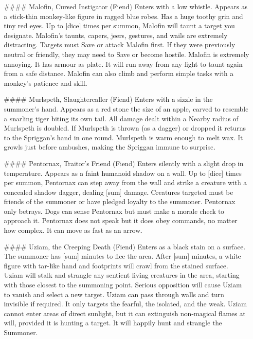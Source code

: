 ####  Malofin, Cursed Instigator (Fiend)
Enters with a low whistle. Appears as a stick-thin monkey-like figure in ragged blue robes. Has a huge toothy grin and tiny red eyes. Up to [dice] times per summon, Malofin will taunt a target you designate. Malofin's taunts, capers, jeers, gestures, and wails are extremely distracting. Targets must Save or attack Malofin first. If they were previously neutral or friendly, they may need to Save or become hostile. Malofin is extremely annoying. It has armour as plate. It will run away from any fight to taunt again from a safe distance. Malofin can also climb and perform simple tasks with a monkey's patience and skill.

####  Murlspeth, Slaughtercaller (Fiend)
Enters with a sizzle in the summoner's hand. Appears as a red stone the size of an apple, carved to resemble a snarling tiger biting its own tail. All damage dealt within a Nearby radius of Murlspeth is doubled. If Murlspeth is thrown (as a dagger) or dropped it returns to the Spriggan's hand in one round. Murlspeth is warm enough to melt wax. It growls just before ambushes, making the Spriggan immune to surprise.


####  Pentornax, Traitor's Friend (Fiend)
Enters silently with a slight drop in temperature. Appears as a faint humanoid shadow on a wall. Up to [dice] times per summon, Pentornax can step away from the wall and strike a creature with a concealed shadow dagger, dealing [sum] damage. Creatures targeted must be friends of the summoner or have pledged loyalty to the summoner. Pentornax only betrays. Dogs can sense Pentornax but must make a morale check to approach it. Pentornax does not speak but it does obey commands, no matter how complex. It can move as fast as an arrow.


####  Uziam, the Creeping Death (Fiend)
Enters as a black stain on a surface. The summoner has [sum] minutes to flee the area. After [sum] minutes, a white figure with tar-like hand and footprints will crawl from the stained surface. Uziam will stalk and strangle any sentient living creatures in the area, starting with those closest to the summoning point. Serious opposition will cause Uziam to vanish and select a new target. Uziam can pass through walls and turn invisible if required. It only targets the fearful, the isolated, and the weak. Uziam cannot enter areas of direct sunlight, but it can extinguish non-magical flames at will, provided it is hunting a target. It will happily hunt and strangle the Summoner.



